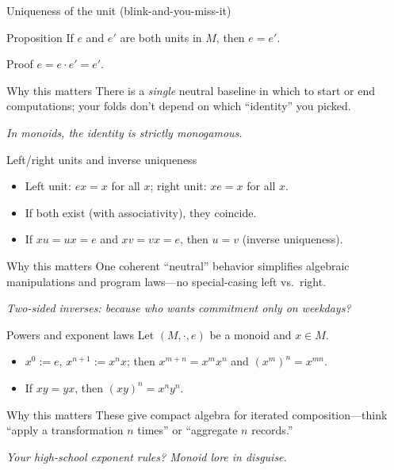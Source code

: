 \documentclass[aspectratio=169,11pt]{beamer}
\newcommand{\tline}[1]{\par\medskip\textcolor{transit}{\emph{#1}}\par\medskip}
\begin{document}
\begin{frame}{Uniqueness of the unit (blink-and-you-miss-it)}
\begin{block}{Proposition}
If $e$ and $e'$ are both units in $M$, then $e=e'$.
\end{block}
\begin{block}{Proof}
$e=e\cdot e'=e'$.
\end{block}
\begin{alertblock}{Why this matters}
There is a \emph{single} neutral baseline in which to start or end computations; your folds don't depend on which “identity” you picked.
\end{alertblock}
\tline{In monoids, the identity is strictly monogamous.}
\end{frame}

\begin{frame}{Left/right units and inverse uniqueness}
\begin{itemize}
  \item Left unit: $ex=x$ for all $x$; right unit: $xe=x$ for all $x$.
  \item If both exist (with associativity), they coincide.
  \item If $xu=ux=e$ and $xv=vx=e$, then $u=v$ (inverse uniqueness).
\end{itemize}
\begin{alertblock}{Why this matters}
One coherent “neutral” behavior simplifies algebraic manipulations and program laws—no special-casing left vs.\ right.
\end{alertblock}
\tline{Two-sided inverses: because who wants commitment only on weekdays?}
\end{frame}

\begin{frame}{Powers and exponent laws}
Let $(M,\cdot,e)$ be a monoid and $x\in M$.
\begin{itemize}
  \item $x^0:=e$, $x^{n+1}:=x^n x$; then $x^{m+n}=x^mx^n$ and $(x^m)^n=x^{mn}$.
  \item If $xy=yx$, then $(xy)^n=x^ny^n$.
\end{itemize}
\begin{alertblock}{Why this matters}
These give compact algebra for iterated composition—think “apply a transformation $n$ times” or “aggregate $n$ records.”
\end{alertblock}
\tline{Your high-school exponent rules? Monoid lore in disguise.}
\end{frame}
\end{document}
